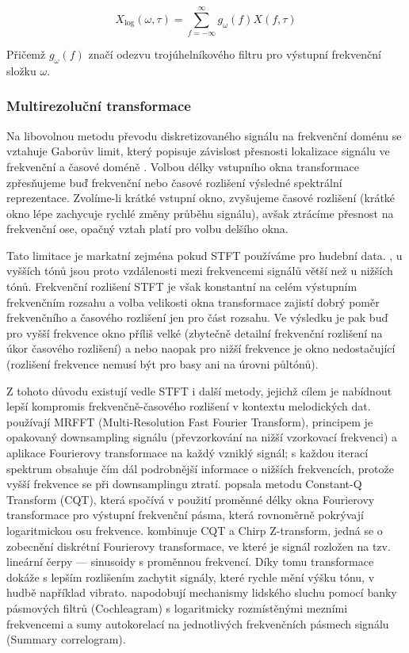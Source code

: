$$ X_{\mathrm{log}}(\omega, \tau) = \sum^{\infty}_{f=-\infty}{g_\omega(f)X(f, \tau)}$$

Přičemž $g_\omega(f)$ značí odezvu trojúhelníkového filtru pro výstupní frekvenční složku $\omega$.

\subsubsection{Multirezoluční transformace}\label{sec:multirezolucni}

Na libovolnou metodu převodu diskretizovaného signálu na frekvenční doménu se vztahuje Gaborův limit, který popisuje závislost přesnosti lokalizace signálu ve frekvenční a časové doméně \citep{Gabor1945}. Volbou délky vstupního okna transformace zpřesňujeme buď frekvenční nebo časové rozlišení výsledné spektrální reprezentace. Zvolíme-li krátké vstupní okno, zvyšujeme časové rozlišení (krátké okno lépe zachycuje rychlé změny průběhu signálu), avšak ztrácíme přesnost na frekvenční ose, opačný vztah platí pro volbu delšího okna.

Tato limitace je markatní zejména pokud STFT používáme pro hudební data. , u vyšších tónů jsou proto vzdálenosti mezi frekvencemi signálů větší než u nižších tónů. Frekvenční rozlišení STFT je však konstantní na celém výstupním frekvenčním rozsahu a volba velikosti okna transformace zajistí dobrý poměr frekvenčního a časového rozlišení jen pro část rozsahu. Ve výsledku je pak buď pro vyšší frekvence okno příliš velké (zbytečně detailní frekvenční rozlišení na úkor časového rozlišení) a nebo naopak pro nižší frekvence je okno nedostačující (rozlišení frekvence nemusí být pro basy ani na úrovni půltónů).

Z tohoto důvodu existují vedle STFT i další metody, jejichž cílem je nabídnout lepší kompromis frekvenčně-časového rozlišení v kontextu melodických dat. \cite{Goto1999} používají MRFFT (Multi-Resolution Fast Fourier Transform), principem je opakovaný downsampling signálu (převzorkování na nižší vzorkovací frekvenci) a aplikace Fourierovy transformace na každý vzniklý signál; s každou iterací spektrum obsahuje čím dál podrobnější informace o nižších frekvencích, protože vyšší frekvence se při downsamplingu ztratí. \cite{Brown1990} popsala metodu Constant-Q Transform (CQT), která spočívá v použití proměnné délky okna Fourierovy transformace pro výstupní frekvenční pásma, která rovnoměrně pokrývají logaritmickou osu frekvence. \cite{Cancela2010} kombinuje CQT a Chirp Z-transform, jedná se o zobecnění diskrétní Fourierovy transformace, ve které je signál rozložen na tzv. lineární čerpy --- sinusoidy s proměnnou frekvencí. Díky tomu transformace dokáže s lepším rozlišením zachytit signály, které rychle mění výšku tónu, v hudbě například vibrato. \cite{Paiva2004} napodobují mechanismy lidského sluchu pomocí banky pásmových filtrů (Cochleagram) s logaritmicky rozmístěnými mezními frekvencemi a sumy autokorelací na jednotlivých frekvenčních pásmech signálu (Summary correlogram).

